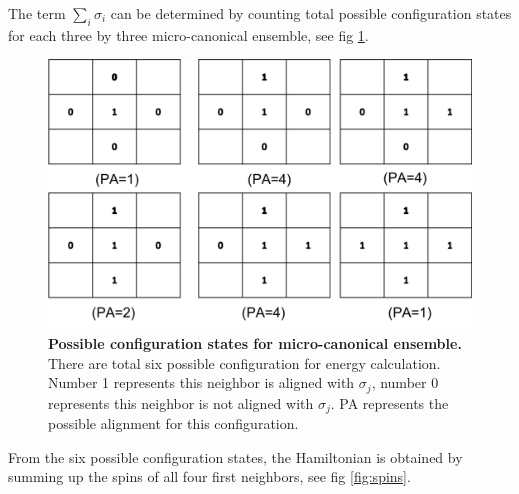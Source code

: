 \documentclass{llncs}
\begin{document}
The term $\sum_i \sigma_i$ can be determined by counting total possible configuration states for each three by three micro-canonical ensemble, see fig \ref{fig:configuration}. 

\begin{figure}
	\includegraphics[width=\linewidth]{images/configuration.png}
	\caption{\textbf{Possible configuration states for micro-canonical ensemble.} There are total six possible configuration for energy calculation. Number 1 represents this neighbor is aligned with $\sigma_j$, number 0 represents this neighbor is not aligned with $\sigma_j$. PA represents the possible alignment for this configuration.}
	\label{fig:configuration}
\end{figure}
From the six possible configuration states, the Hamiltonian is obtained by summing up the spins of all four first neighbors, see fig \ref{fig:spins}. 
\end{document}
